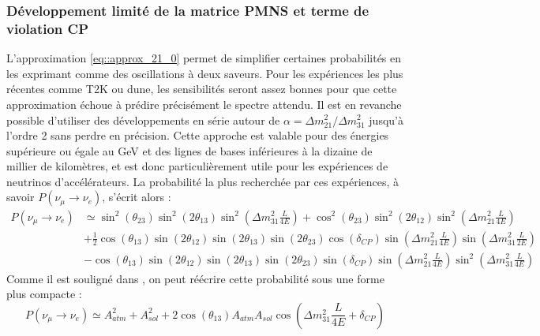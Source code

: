             \subsubsection{Développement limité de la matrice PMNS et terme de violation CP}
            L'approximation \eqref{eq::approx_21_0} permet de simplifier certaines probabilités en les exprimant comme des oscillations à deux saveurs. Pour les expériences les plus récentes comme T2K ou \gls{dune}, les sensibilités seront assez bonnes pour que cette approximation échoue à prédire précisément le spectre attendu. Il est en revanche possible d'utiliser des développements en série autour de $\alpha=\Delta m^2_{21}/\Delta m^2_{31}$ jusqu'à l'ordre 2 sans perdre en précision. Cette approche est valable pour des énergies supérieure ou égale au \si{\giga\electronvolt} et des lignes de bases inférieures à la dizaine de millier de kilomètres\cite{Freund2001}, et est donc particulièrement utile pour les expériences de neutrinos d'accélérateurs. La probabilité la plus recherchée par ces expériences, à savoir $P(\nu_{\mu}\to\nu_e)$, s'écrit alors\cite{Giganti2017}
             : 
            \begin{equation}\label{eq::dvpt_3flavor_accelerator}
                \begin{split}
                P(\nu_{\mu}\to\nu_e) & \simeq  \sin^2(\theta_{23})\sin^2(2\theta_{13})\sin^2\left(\Delta m^2_{31}\frac{L}{4E}\right)
                + \cos^2(\theta_{23})\sin^2(2\theta_{12})\sin^2\left(\Delta m^2_{21}\frac{L}{4E}\right) \\ 
                & + \frac{1}{2}\cos(\theta_{13})\sin(2\theta_{12})\sin(2\theta_{13})\sin(2\theta_{23})\cos(\delta_{CP})\sin\left(\Delta m^2_{21}\frac{L}{4E}\right)\sin\left(\Delta m^2_{31}\frac{L}{2E}\right) \\
                & - \cos(\theta_{13})\sin(2\theta_{12})\sin(2\theta_{13})\sin(2\theta_{23})\sin(\delta_{CP})\sin\left(\Delta m^2_{21}\frac{L}{4E}\right)\sin^2\left(\Delta m^2_{31}\frac{L}{4E}\right)
                \end{split}
            \end{equation}
            Comme il est souligné dans \cite{Giganti2017}, on peut réécrire cette probabilité sous une forme plus compacte : 
            \begin{equation}
                P(\nu_{\mu}\to\nu_e) \simeq A^2_{atm} + A^2_{sol} + 2\cos(\theta_{13})A_{atm}A_{sol}\cos\left(\Delta m^2_{31}\frac{L}{4E} + \delta_{CP}\right)
            \end{equation}
